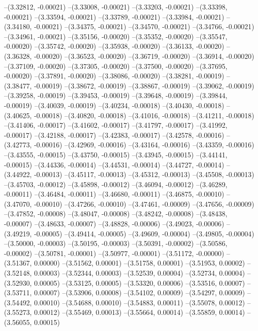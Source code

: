 --(3.32812, -0.00021)
--(3.33008, -0.00021)
--(3.33203, -0.00021)
--(3.33398, -0.00021)
--(3.33594, -0.00021)
--(3.33789, -0.00021)
--(3.33984, -0.00021)
--(3.34180, -0.00021)
--(3.34375, -0.00021)
--(3.34570, -0.00021)
--(3.34766, -0.00021)
--(3.34961, -0.00021)
--(3.35156, -0.00020)
--(3.35352, -0.00020)
--(3.35547, -0.00020)
--(3.35742, -0.00020)
--(3.35938, -0.00020)
--(3.36133, -0.00020)
--(3.36328, -0.00020)
--(3.36523, -0.00020)
--(3.36719, -0.00020)
--(3.36914, -0.00020)
--(3.37109, -0.00020)
--(3.37305, -0.00020)
--(3.37500, -0.00020)
--(3.37695, -0.00020)
--(3.37891, -0.00020)
--(3.38086, -0.00020)
--(3.38281, -0.00019)
--(3.38477, -0.00019)
--(3.38672, -0.00019)
--(3.38867, -0.00019)
--(3.39062, -0.00019)
--(3.39258, -0.00019)
--(3.39453, -0.00019)
--(3.39648, -0.00019)
--(3.39844, -0.00019)
--(3.40039, -0.00019)
--(3.40234, -0.00018)
--(3.40430, -0.00018)
--(3.40625, -0.00018)
--(3.40820, -0.00018)
--(3.41016, -0.00018)
--(3.41211, -0.00018)
--(3.41406, -0.00017)
--(3.41602, -0.00017)
--(3.41797, -0.00017)
--(3.41992, -0.00017)
--(3.42188, -0.00017)
--(3.42383, -0.00017)
--(3.42578, -0.00016)
--(3.42773, -0.00016)
--(3.42969, -0.00016)
--(3.43164, -0.00016)
--(3.43359, -0.00016)
--(3.43555, -0.00015)
--(3.43750, -0.00015)
--(3.43945, -0.00015)
--(3.44141, -0.00015)
--(3.44336, -0.00014)
--(3.44531, -0.00014)
--(3.44727, -0.00014)
--(3.44922, -0.00013)
--(3.45117, -0.00013)
--(3.45312, -0.00013)
--(3.45508, -0.00013)
--(3.45703, -0.00012)
--(3.45898, -0.00012)
--(3.46094, -0.00012)
--(3.46289, -0.00011)
--(3.46484, -0.00011)
--(3.46680, -0.00011)
--(3.46875, -0.00010)
--(3.47070, -0.00010)
--(3.47266, -0.00010)
--(3.47461, -0.00009)
--(3.47656, -0.00009)
--(3.47852, -0.00008)
--(3.48047, -0.00008)
--(3.48242, -0.00008)
--(3.48438, -0.00007)
--(3.48633, -0.00007)
--(3.48828, -0.00006)
--(3.49023, -0.00006)
--(3.49219, -0.00005)
--(3.49414, -0.00005)
--(3.49609, -0.00004)
--(3.49805, -0.00004)
--(3.50000, -0.00003)
--(3.50195, -0.00003)
--(3.50391, -0.00002)
--(3.50586, -0.00002)
--(3.50781, -0.00001)
--(3.50977, -0.00001)
--(3.51172, -0.00000)
--(3.51367, 0.00000)
--(3.51562, 0.00001)
--(3.51758, 0.00001)
--(3.51953, 0.00002)
--(3.52148, 0.00003)
--(3.52344, 0.00003)
--(3.52539, 0.00004)
--(3.52734, 0.00004)
--(3.52930, 0.00005)
--(3.53125, 0.00005)
--(3.53320, 0.00006)
--(3.53516, 0.00007)
--(3.53711, 0.00007)
--(3.53906, 0.00008)
--(3.54102, 0.00009)
--(3.54297, 0.00009)
--(3.54492, 0.00010)
--(3.54688, 0.00010)
--(3.54883, 0.00011)
--(3.55078, 0.00012)
--(3.55273, 0.00012)
--(3.55469, 0.00013)
--(3.55664, 0.00014)
--(3.55859, 0.00014)
--(3.56055, 0.00015)
